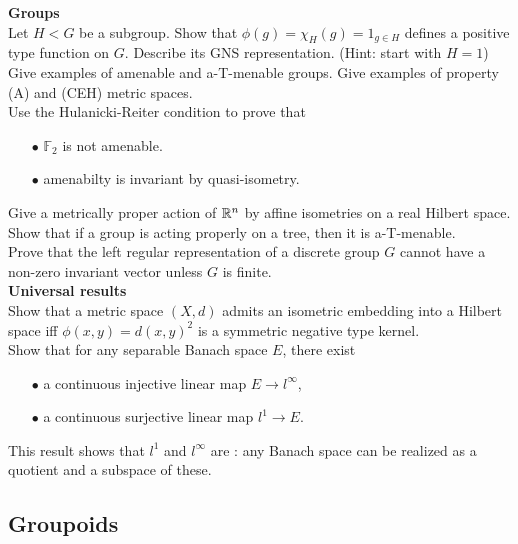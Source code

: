 \textbf{Groups} \\

Let $H<G$ be a subgroup. Show that $\phi(g)=\chi_H(g)= 1_{g\in H}$ defines a positive type function on $G$. Describe its GNS representation. (Hint: start with $H=1$)\\

Give examples of amenable and a-T-menable groups. Give examples of property (A) and (CEH) metric spaces.\\ 

Use the Hulanicki-Reiter condition to prove that
\begin{itemize}
\item[$\bullet$] $\mathbb F_2$ is not amenable.
\item[$\bullet$] amenabilty is invariant by quasi-isometry.	
\end{itemize}

Give a  metrically proper action of $\mathbb R^n$ by affine isometries on a real Hilbert space.\\

Show that if a group is acting properly on a tree, then it is a-T-menable.\\

Prove that the left regular representation of a discrete group $G$ cannot have a non-zero invariant vector unless $G$ is finite.\\

\textbf{Universal results} \\

Show that a metric space $(X,d)$ admits an isometric embedding into a Hilbert space iff $\phi(x,y) = d(x,y)^2$ is a symmetric negative type kernel.\\

Show that for any separable Banach space $E$, there exist
\begin{itemize}
\item[$\bullet$] a continuous injective linear map $E\rightarrow l^\infty$,
\item[$\bullet$] a continuous surjective linear map $l^1 \rightarrow E$.   
\end{itemize}
This result shows that $l^1$ and $l^\infty$ are : any Banach space can be realized as a quotient and a subspace of these.

\subsection{Groupoids}

